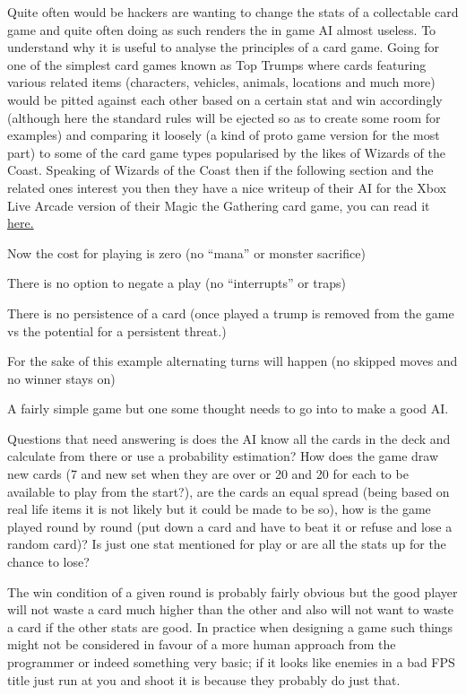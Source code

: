 \documentclass[
]{book}
\begin{document}
Quite often would be hackers are wanting to change the stats of a collectable card game and quite often doing as such renders the in game AI almost useless. To understand why it is useful to analyse the principles of a card game. Going for one of the simplest card games known as Top Trumps where cards featuring various related items (characters, vehicles, animals, locations and much more) would be pitted against each other based on a certain stat and win accordingly (although here the standard rules will be ejected so as to create some room for examples) and comparing it loosely (a kind of proto game version for the most part) to some of the card game types popularised by the likes of Wizards of the Coast. Speaking of Wizards of the Coast then if the following section and the related ones interest you then they have a nice writeup of their AI for the Xbox Live Arcade version of their Magic the Gathering card game, you can read it \href{http://archive.wizards.com/Magic/Magazine/Article.aspx?x=mtg/daily/feature/44}{here.}

Now the cost for playing is zero (no ``mana'' or monster sacrifice)

There is no option to negate a play (no ``interrupts'' or traps)

There is no persistence of a card (once played a trump is removed from the game vs the potential for a persistent threat.)

For the sake of this example alternating turns will happen (no skipped moves and no winner stays on)

A fairly simple game but one some thought needs to go into to make a good AI.

Questions that need answering is does the AI know all the cards in the deck and calculate from there or use a probability estimation? How does the game draw new cards (7 and new set when they are over or 20 and 20 for each to be available to play from the start?), are the cards an equal spread (being based on real life items it is not likely but it could be made to be so), how is the game played round by round (put down a card and have to beat it or refuse and lose a random card)? Is just one stat mentioned for play or are all the stats up for the chance to lose?

The win condition of a given round is probably fairly obvious but the good player will not waste a card much higher than the other and also will not want to waste a card if the other stats are good. In practice when designing a game such things might not be considered in favour of a more human approach from the programmer or indeed something very basic; if it looks like enemies in a bad FPS title just run at you and shoot it is because they probably do just that.
\end{document}
